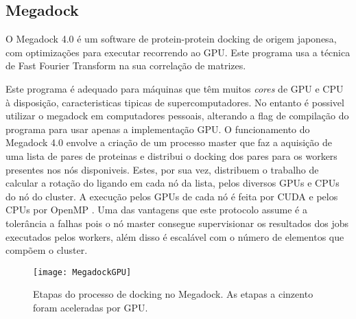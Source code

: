 \subsection {Megadock}
\label{megaD}
O Megadock 4.0\cite{megadock40} é um software de protein-protein docking de origem japonesa, com optimizações para executar recorrendo ao GPU. Este programa usa a técnica de Fast Fourier Transform na sua correlação de matrizes.

Este programa é adequado para máquinas que têm muitos \textit{cores} de GPU e CPU à disposição, caracteristicas tipicas de supercomputadores. No entanto é possivel utilizar o megadock em computadores pessoais, alterando a flag de compilação do programa para usar apenas a implementação GPU.
O funcionamento do Megadock 4.0 envolve a criação de um processo master que faz a aquisição de uma lista de pares de proteinas e distribui o docking dos pares para os workers presentes nos nós disponiveis.
 Estes, por sua vez, distribuem o trabalho de calcular a rotação do ligando em cada nó da lista, pelos diversos GPUs e CPUs do nó do cluster. A execução pelos GPUs de cada nó é feita por CUDA e pelos CPUs por OpenMP . 
 Uma das vantagens que este protocolo assume é a tolerância a falhas pois o nó master consegue supervisionar os resultados dos jobs executados pelos workers, além disso é escalável com o número de elementos que compõem o cluster.

   \begin{figure}[ht]
  \centering
    {\texttt{[image: MegadockGPU]}}
  \caption{Etapas do processo de docking no Megadock. As etapas a cinzento foram aceleradas por GPU\cite{shimoda2015protein}. }
  \label{megadockGPU}
\end{figure}
